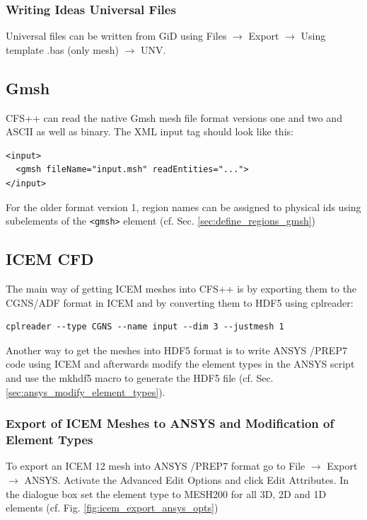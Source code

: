 \subsubsection{Writing Ideas Universal Files}

Universal  files can  be written  from  GiD using  Files $\rightarrow$  Export
$\rightarrow$ Using template .bas (only mesh) $\rightarrow$ UNV.

\subsection{Gmsh}
\label{sec:preproc_gmsh}

CFS++ can  read the  native Gmsh mesh  file format  versions one and  two and
ASCII as well as binary. The XML input tag should look like this:

\begin{verbatim}
<input>
  <gmsh fileName="input.msh" readEntities="...">
</input>
\end{verbatim}

For the older format  version 1, region names can be  assigned to physical ids
using       subelements      of       the      {\tt       <gmsh>}      element
(cf. Sec. \ref{sec:define_regions_gmsh})

\subsection{ICEM CFD}

The main  way of getting ICEM  meshes into CFS++  is by exporting them  to the
CGNS/ADF format in ICEM and by converting them to HDF5 using cplreader:

\begin{verbatim}
cplreader --type CGNS --name input --dim 3 --justmesh 1
\end{verbatim}

Another way to get  the meshes into HDF5 format is to  write ANSYS /PREP7 code
using ICEM and afterwards modify the element types in the ANSYS script and use
the      mkhdf5      macro      to       generate      the      HDF5      file
(cf. Sec. \ref{sec:ansys_modify_element_types}).

\subsubsection{Export of ICEM Meshes to ANSYS and Modification of Element Types}

To export  an ICEM 12 mesh into  ANSYS /PREP7 format go  to File $\rightarrow$
Export $\rightarrow$ ANSYS. Activate the  Advanced Edit Options and click Edit
Attributes.  In the  dialogue box set the element type to  MESH200 for all 3D,
2D and 1D elements (cf. Fig. \ref{fig:icem_export_ansys_opts})

